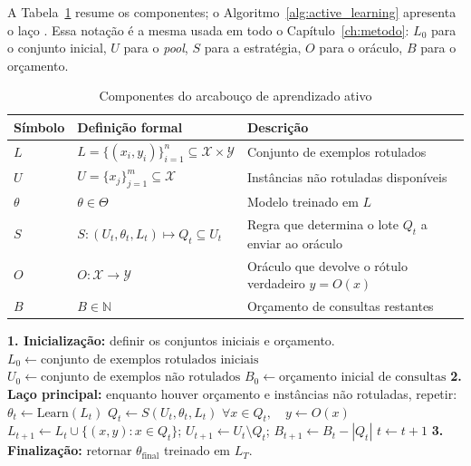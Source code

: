 A Tabela~\ref{tab:active-learning-components} resume os componentes; o
Algoritmo~\ref{alg:active_learning} apresenta o laço \cite{Settles2012,
Goudjil2018}. Essa notação é a mesma usada em todo o
Capítulo~\ref{ch:metodo}: $L_0$ para o conjunto inicial, $U$ para o
\textit{pool}, $S$ para a estratégia, $O$ para o oráculo, $B$ para o
orçamento.

\begin{table}[ht]
  \centering
  \caption{Componentes do arcabouço de aprendizado ativo}
  \label{tab:active-learning-components}
  \vspace{0.5em}
  \begin{tabular}{@{}lll@{}}
    \toprule
    \textbf{Símbolo} &
    \textbf{Definição formal} &
    \textbf{Descrição} \\ \midrule
    \(L\) &
    \(L = \{(x_i,y_i)\}_{i=1}^{n}\subseteq \mathcal{X}\times\mathcal{Y}\) &
    Conjunto de exemplos rotulados \\[0.25em]
    \(U\) &
    \(U = \{x_j\}_{j=1}^{m}\subseteq \mathcal{X}\) &
    Instâncias não rotuladas disponíveis \\[0.25em]
    \(\theta\) &
    \(\theta \in \Theta\) &
    Modelo treinado em \(L\) \\[0.25em]
    \(S\) & \( S : (U_t,\theta_t,L_t)\mapsto Q_t\subseteq U_t\) &
    Regra que determina o lote \( Q_t \) a enviar ao oráculo \\[0.25em]
    \(O\) &
    \(O : \mathcal{X} \rightarrow \mathcal{Y}\) &
    Oráculo que devolve o rótulo verdadeiro \(y = O(x)\) \\[0.25em]
    \(B\) &
    \(B \in \mathbb{N}\) &
    Orçamento de consultas restantes \\ \bottomrule
  \end{tabular}
\end{table}

\FloatBarrier

\begin{algorithm}[H]
  \caption{Esquema geral de aprendizado ativo}
  \label{alg:active_learning}
  \begin{algorithmic}[1]
    \State \textbf{1. Inicialização:} definir os conjuntos iniciais e orçamento.
    \State \quad \(L_0 \leftarrow \text{conjunto de exemplos rotulados iniciais}\)
    \State \quad \(U_0 \leftarrow \text{conjunto de exemplos não rotulados}\)
    \State \quad \(B_0 \leftarrow \text{orçamento inicial de consultas}\)
    \State \textbf{2. Laço principal:} enquanto houver orçamento e instâncias não rotuladas, repetir:
    \State \quad \(\theta_t \leftarrow \mathrm{Learn}(L_t)\)
    \State \quad \(Q_t \leftarrow S(U_t, \theta_t, L_t)\)
    \State \quad \(\forall x \in Q_t, \quad y \leftarrow O(x)\)
    \State \quad \(L_{t+1} \leftarrow L_t \cup \{(x, y) : x \in Q_t\}\); \(U_{t+1} \leftarrow U_t \setminus Q_t\); \(B_{t+1} \leftarrow B_t - |Q_t|\)
    \State \quad \(t \leftarrow t + 1\)
    \State \textbf{3. Finalização:} retornar \(\theta_{\mathrm{final}}\) treinado em \(L_T\).
  \end{algorithmic}
\end{algorithm}

